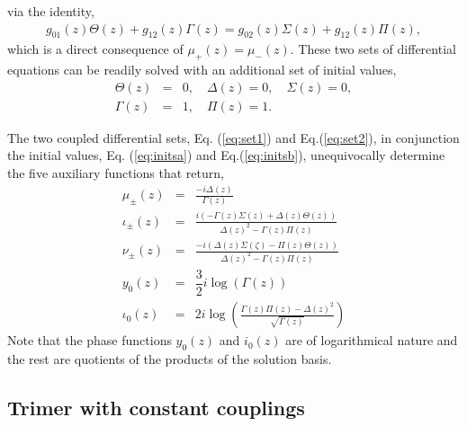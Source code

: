 \documentclass[9pt,twocolumn,twoside]{osajnl}
\begin{document}
via the identity, 
\begin{eqnarray}
g_{01}(z)\Theta(z) + g_{12}(z) \Gamma(z) =  g_{02}(z) \Sigma (z) + g_{12}(z) \Pi (z),
\end{eqnarray}
which is a direct consequence of $\mu_{+}(z)=\mu_{-}(z)$.
These two sets of differential equations can be readily solved with an additional set of initial values,
\begin{eqnarray}
\Theta(z)&=& 0 , \quad \Delta(z) =  0, \quad \Sigma(z)= 0,   \label{eq:initsa} \\
\Gamma(z)&=& 1, \quad \Pi(z)= 1. \label{eq:initsb}
\end{eqnarray}



The two coupled differential sets, Eq. (\ref{eq:set1}) and Eq.(\ref{eq:set2}), in conjunction the initial values, Eq. (\ref{eq:initsa}) and Eq.(\ref{eq:initsb}), 
unequivocally determine the five auxiliary functions that return, 
\begin{eqnarray}
\mu_{\pm}(z) &=& \frac{-i \Delta(z)}{\Gamma(z)} \\
\iota_{\pm}(z) &=& \frac{i(-\Gamma(z)\Sigma(z)+\Delta(z)\Theta(z))}{\Delta(z)^2-\Gamma(z)\Pi(z)}\\
\nu_{\pm}(z) &=& \frac{-i(\Delta(z)\Sigma(\zeta)-\Pi(z)\Theta(z))}{\Delta(z)^2-\Gamma(z)\Pi(z)}\\
y_0(z) &=&  \dfrac{3}{2} i \log (\Gamma(z))\label{eq:yzeto}\\
\iota_0(z) &=& 2 i \log (\frac{\Gamma(z)\Pi(z)-\Delta(z)^2}{\sqrt{\Gamma(z)}}) \label{eq:izero}
\end{eqnarray}
Note that the phase functions $y_0(z)$ and $i_0(z)$ are of logarithmical nature and the rest are quotients of the products of the solution basis. 


\subsection{Trimer with constant couplings}
\end{document}
